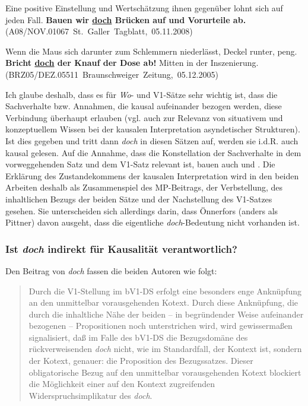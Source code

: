 {\begin{exe}
	\ex\label{1029}
	 \scriptsize 
	Eine positive Einstellung und Wertschätzung ihnen gegenüber lohnt sich auf jeden Fall. \textbf{Bauen wir \underline{doch} Brücken auf und Vorurteile 		ab.}                  		
	\hfill\hbox {(A08/NOV.01067 St. Galler Tagblatt, 05.11.2008)}
\end{exe}

\begin{exe}
	\ex\label{1030}
	 \scriptsize 
	Wenn die Maus sich darunter zum Schlemmern niederlässt, Deckel runter, peng. \textbf{Bricht \underline{doch} der Knauf der Dose ab!} Mitten in der 			Inszenierung.    
	\newline              		
	\hbox{}\hfill\hbox {(BRZ05/DEZ.05511 Braunschweiger Zeitung, 05.12.2005)}
\end{exe}
Ich glaube deshalb, dass es für \textit{Wo}- und V1-Sätze sehr wichtig ist, dass die Sachverhalte bzw. Annahmen, die kausal aufeinander bezogen werden, diese Verbindung überhaupt erlauben (vgl. auch \citealt[87-128]{Gohl2000} zur Relevanz von situativem und konzeptuellem Wissen bei der kausalen Interpretation  asyndetischer Strukturen). Ist dies gegeben und tritt dann \textit{doch} in diesen Sätzen auf, werden sie i.d.R. auch kausal gelesen. Auf die Annahme, dass die Konstellation der Sachverhalte in dem vorweggehenden Satz und dem V1-Satz relevant ist, bauen auch \citet{Oennerfors1997} und \citet{Pittner2011}. Die Erklärung des Zustandekommens der kausalen Interpretation wird in den beiden Arbeiten deshalb als Zusammenspiel des MP-Beitrags, der Verbstellung, des inhaltlichen Bezugs der beiden Sätze und der Nachstellung des V1-Satzes gesehen. Sie unterscheiden sich allerdings darin, dass Önnerfors (anders als Pittner) davon ausgeht, dass die eigentliche \textit{doch}-Bedeutung nicht vorhanden ist.

\subsubsection{Ist \textit{doch} indirekt für Kausalität verantwortlich?}
\label{sec:kausalind}
Den Beitrag von \textit{doch} fassen die beiden Autoren wie folgt:

\begin{quotation}
Durch die V1-Stellung im bV1-DS erfolgt eine besonders enge Anknüpfung an den unmittelbar vorausgehenden Kotext. Durch diese Anknüpfung, die durch die inhaltliche Nähe der beiden – in begründender Weise aufeinander bezogenen – Propositionen noch unterstrichen wird, wird gewissermaßen signalisiert, daß im Falle des bV1-DS die \glq Bezugsdomäne\grq {} des rückverweisenden \textit{doch} nicht, wie im Standardfall, der Kontext ist, sondern der Kotext, genauer: die Proposition des Bezugssatzes. Dieser obligatorische Bezug auf den unmittelbar vorausgehenden Kotext blockiert die Möglichkeit einer auf den Kontext zugreifenden Widerspruchsimplikatur des \textit{doch}.                            
\newline              		
\hbox{}\hfill\hbox {\citet[170]{Oennerfors1997}}
\end{quotation}

}
